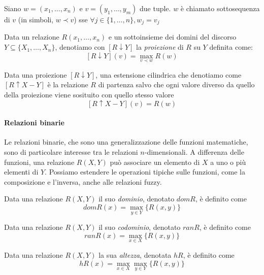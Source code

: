 \begin{definizione}
    Siano $w = (x_1, \dots, x_n)$ e $v = (y_1, \dots, y_m)$ due tuple. $w$ è chiamato sottosequenza di $v$ (in simboli, $w \prec v$) sse $\forall j \in \{1,\dots,n\}, w_j = v_j$
\end{definizione}

\begin{definizione}
    Data un relazione $R(x_1,\dots,x_n)$ e un sottoinsieme dei domini del discorso $Y \subseteq \{X_1, \dots, X_n\}$, denotiamo con $[R \downarrow Y]$ la \emph{proiezione} di $R$ su $Y$ definita come:
    $$[R \downarrow Y](v) = \max_{v \prec w} R(w)$$
\end{definizione}

\begin{definizione}
    Data una proiezione $[R \downarrow Y]$, una estensione cilindrica che denotiamo come $[R \uparrow X-Y]$ è la relazione $R$ di partenza salvo che ogni valore diverso da quello della proiezione viene sosituito con quello stesso valore
    $$[R \uparrow X-Y](v) = R(w)$$
\end{definizione}

\paragraph{Relazioni binarie}
Le relazioni binarie, che sono una generalizzazione delle funzioni matematiche, sono di particolare interesse tra le relazioni $n$-dimensionali. A differenza delle funzioni, una relazione $R(X,Y)$ può associare un elemento di $X$ a uno o più elementi di $Y$. Possiamo estendere le operazioni tipiche sulle funzioni, come la composizione e l'inversa, anche alle relazioni fuzzy.

\begin{definizione}
    Data una relazione $R(X,Y)$ il suo \textit{dominio}, denotato $dom R$, è definito come
    $$dom R(x) = \max_{y \in Y}\{ R(x,y) \}$$
\end{definizione}

\begin{definizione}
    Data una relazione $R(X,Y)$ il suo \textit{codominio}, denotato $ran R$, è definito come
    $$ran R(x) = \max_{x \in X}\{ R(x,y) \}$$
\end{definizione}

\begin{definizione}
    Data una relazione $R(X,Y)$ la sua \textit{altezza}, denotata $h R$, è definito come
    $$h R(x) = \max_{x \in X} \max_{y \in Y} \{ R(x,y) \}$$
\end{definizione}

